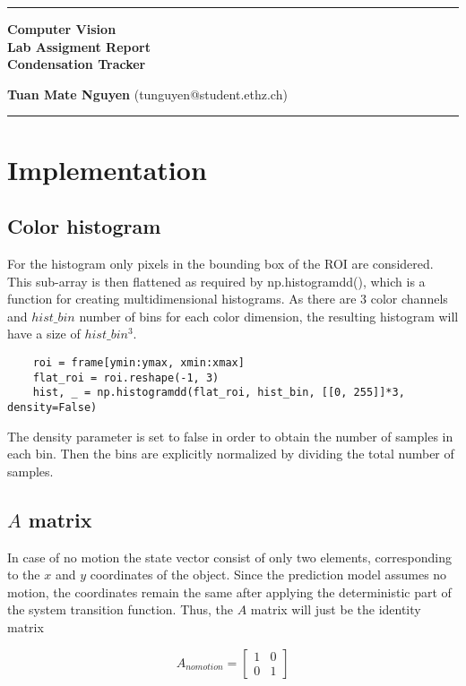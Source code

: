 \documentclass[10pt,a4paper,twoside]{article}
\begin{document}
\begin{center}
\hrule

\vspace{.4cm}
{\bf {\Huge Computer Vision} \\ {\huge Lab Assigment Report} \\ {\Large Condensation Tracker}}
\vspace{.2cm}
\end{center}
{\bf Tuan Mate Nguyen}  (tunguyen@student.ethz.ch)
\hrule


\section{Implementation}
\subsection{Color histogram}
For the histogram only pixels in the bounding box of the ROI are considered. This sub-array is then flattened as
required by np.histogramdd(), which is a function for creating multidimensional
histograms. As there are 3 color channels and $hist\_bin$ number of bins for each
color dimension, the resulting histogram will have a size of $hist\_bin^3$.

\begin{verbatim}
    roi = frame[ymin:ymax, xmin:xmax]
    flat_roi = roi.reshape(-1, 3)
    hist, _ = np.histogramdd(flat_roi, hist_bin, [[0, 255]]*3, density=False)
\end{verbatim}

The density parameter is set to false in order to obtain the number of samples in
each bin. Then the bins are explicitly normalized by dividing the total number of
samples.

\subsection{$A$ matrix}
In case of no motion the state vector consist of only two elements,
corresponding to the $x$ and $y$ coordinates of the object. Since the prediction
model assumes no motion, the coordinates remain the same after applying the
deterministic part of the system transition function. Thus, the $A$ matrix will
just be the identity matrix

\[ A_{no motion} =
\begin{bmatrix}
    1 & 0 \\
    0 & 1 
\end{bmatrix}
\]
\end{document}
